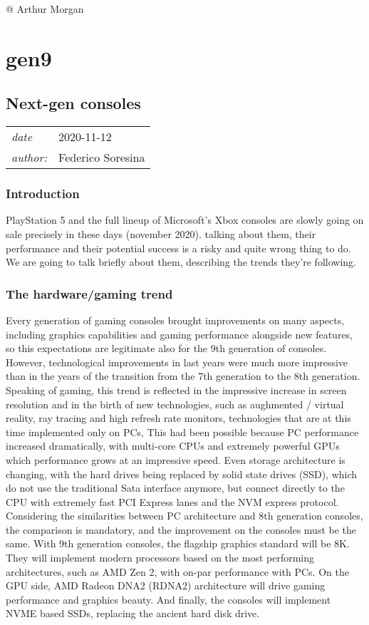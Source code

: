 \documentclass[a4paper,10pt]{book}
\newcommand{\pageHeader}[4]{
    \section{#1}
    \vspace{-0.3cm}
    \begin{table}[h!]
     \begin{tabular}{ll}
        \hline
        \textit{date} & #2 \\
        \textit{author: } & #3\\
        \hline
     \end{tabular}
    \end{table}
    \vspace{-0.3cm}
}
\begin{document}
 
 
          @ Arthur Morgan
       
 
 
 \newpage\chapter{gen9}\newpage\pageHeader{Next-gen consoles}{2020-11-12}{Federico Soresina}{next-generation console description page}
 \subsection{ Introduction  }
  PlayStation 5 and the full lineup of Microsoft's Xbox consoles are slowly going on sale precisely in these days (november 2020). talking about them, their performance and their potential success is a risky and quite wrong thing to do. We are going to talk briefly about them, describing the trends they're following.  
 \subsection{ The hardware/gaming trend  }
  Every generation of gaming consoles brought improvements on many aspects, including graphics capabilities and gaming performance alongside new features, so this expectations are legitimate also for the 9th generation of consoles. However, technological improvements in last years were much more impressive than in the years of the transition from the 7th generation to the 8th generation.  
  Speaking of gaming, this trend is reflected in the impressive increase in screen resolution and in the birth of new technologies, such as aughmented / virtual reality, ray tracing and high refresh rate monitors, technologies that are at this time implemented only on PCs, This had been possible because PC performance increased dramatically, with multi-core CPUs and extremely powerful GPUs which performance grows at an impressive speed. Even storage architecture is changing, with the hard drives being replaced by solid state drives (SSD), which do not use the traditional Sata interface anymore, but connect directly to the CPU with extremely fast PCI Express lanes and the NVM express protocol. Considering the similarities between PC architecture and 8th generation consoles, the comparison is mandatory, and the improvement on the consoles must be the same.  
  With 9th generation consoles, the flagship graphics standard will be 8K. They will implement modern processors based on the most performing architectures, such as AMD Zen 2, with on-par performance with PCs. On the GPU side, AMD Radeon DNA2 (RDNA2) architecture will drive gaming performance and graphics beauty. And finally, the consoles will implement NVME based SSDs, replacing the ancient hard disk drive.  
\end{document}
